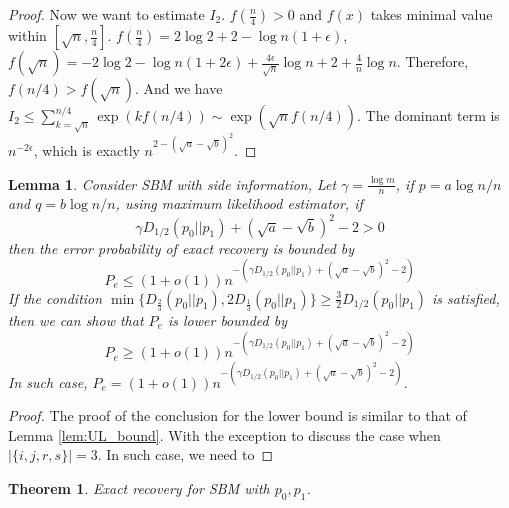 \documentclass{article}
\newtheorem{theorem}{Theorem}
\newtheorem{lemma}{Lemma}
\begin{document}
\begin{proof}
	Now we want to estimate $I_2$. $f(\frac{n}{4}) > 0$ and $f(x)$ takes minimal value within $[\sqrt{n}, \frac{n}{4}]$.
	$f(\frac{n}{4}) = 2\log 2 + 2 - \log n (1+\epsilon)$, $f(\sqrt{n}) = -2\log 2 - \log n(1+2\epsilon) + \frac{4\epsilon}{\sqrt{n}}\log n + 2 + \frac{4}{n}\log n $.
	Therefore, $f(n/4) > f(\sqrt{n})$. And we have $I_2 \leq \sum_{k=\sqrt{n}}^{n/4} \exp(kf(n/4)) \sim \exp(\sqrt{n}f(n/4))$.
	The dominant term is $n^{-2\epsilon}$, which is exactly $n^{2-(\sqrt{a} - \sqrt{b})^2}$.
	

\end{proof}
\begin{lemma}
	Consider SBM with side information, 
	Let $\gamma = \frac{\log m}{n}$, if $p = a \log n /n$ and $q = b \log n / n$, using maximum likelihood estimator,
	if
	\begin{equation}\label{eq:positive_condition}
	\gamma D_{1/2}(p_0||p_1) + (\sqrt{a} - \sqrt{b})^2-2 > 0
	\end{equation}
	then the error probability
	of exact recovery is bounded by
	\begin{equation}\label{eq:PeMain}
	P_e \leq (1+o(1)) n^{-\left(\gamma D_{1/2}(p_0||p_1) + (\sqrt{a} - \sqrt{b})^2-2\right)}
	\end{equation}
	If the condition $\min \{D_{\frac{2}{3}}(p_0||p_1), 2D_{\frac{1}{3}}(p_0||p_1) \} \geq \frac{3}{2} D_{1/2}(p_0||p_1)$
	is satisfied, then we can show that $P_e$ is lower bounded by
	\begin{equation}\label{eq:PeMainL}
	P_e \geq (1+o(1)) n^{-\left(\gamma D_{1/2}(p_0||p_1) + (\sqrt{a} - \sqrt{b})^2-2\right)}
	\end{equation}
	In such case, $P_e=(1+o(1)) n^{-\left(\gamma D_{1/2}(p_0||p_1) + (\sqrt{a} - \sqrt{b})^2-2\right)}$.
\end{lemma}
\begin{proof}
	The proof of the conclusion for the lower bound is similar to that of Lemma \ref{lem:UL_bound}.
	With the exception to discuss the case when $|\{i,j,r,s\}|=3$. In such case, we need to 
\end{proof}
\begin{theorem}
	Exact recovery for SBM with $p_0, p_1$.
\end{theorem}
\end{document}
